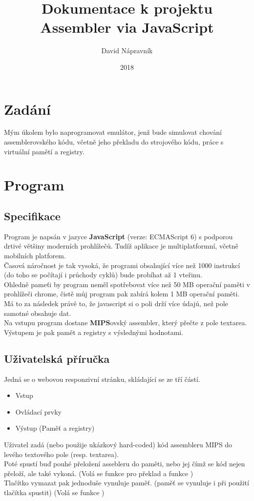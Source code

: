 \documentclass[a4paper,titlepage]{article}
\title{Dokumentace k projektu \\ Assembler via JavaScript} %
\author{David Nápravník} %
\date{2018} %
\begin{document}
 
\maketitle

\section{Zadání }
	Mým úkolem bylo naprogramovat emulátor, jenž bude simulovat chování assemblerovského kódu,
	včetně jeho překladu do strojového kódu, práce s virtuální pamětí a registry.\\
	
\section{Program}
\subsection{Specifikace}
	Program je napsán v jazyce \textbf{JavaScript} (verze: ECMAScript 6) s podporou drtivé většiny moderních prohlížečů.
	Tudíž aplikace je multiplatformní, včetně mobilních platforem. \\	
	
	\noindent Časová náročnost je tak vysoká, že programi obsahující více než 1000 instrukcí (do toho se počítají i průchody cyklů)
	bude probíhat až 1 vteřinu.\\
	Ohledně pameťi by program neměl spotřebovat více než 50 MB operační paměti v prohlížeči chrome, čistě můj program pak zabírá kolem 1 MB operační paměti.
	Má to za následek právě to, že javascript si o poli drží více údajů, než pole samotné obsahuje dat.\\
	
	\noindent Na vstupu program dostane \textbf{MIPS}ovský assembler, který přečte z pole textarea.\\
	Výstupem je pak pamět a registry s výslednými hodnotami.


\subsection{Uživatelská příručka}
	Jedná se o webovou responzivní stránku, skládající se ze tří částí.
	\begin{itemize}
	\item Vstup
	\item Ovládací prvky
	\item Výstup (Paměť a registry)
	\end{itemize}
	Uživatel zadá (nebo použije ukázkový hard-coded) kód assembleru MIPS do levého textového pole (resp. textarea).\\
	Poté spustí buď pouhé přeložení assebleru do paměti, nebo jej   čímž se kód nejen přeloží, ale také vykoná.
	(Volá se funkce  pro překlad a funkce )\\
	Tlačítko vymazat pak jednoduše vynuluje paměť. (paměť se vynuluje i při použití tlačítka spustit) (Volá se funkce )\\
	
\end{document}

